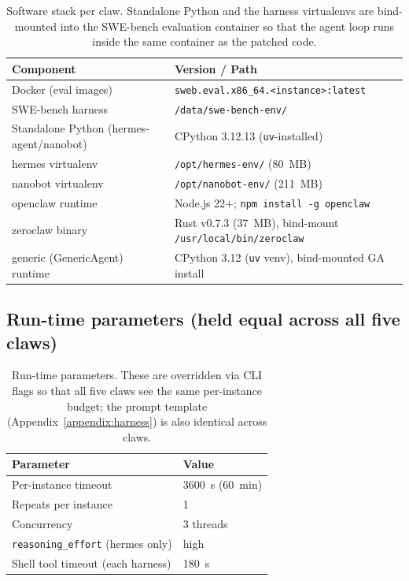 \begin{table}[h]
\centering
\small
\begin{tabular}{ll}
\toprule
\textbf{Component} & \textbf{Version / Path} \\
\midrule
Docker (eval images)               & \texttt{sweb.eval.x86\_64.<instance>:latest} \\
SWE-bench harness                  & \texttt{/data/swe-bench-env/} \\
Standalone Python (hermes-agent/nanobot) & CPython 3.12.13 (\texttt{uv}-installed) \\
hermes virtualenv                  & \texttt{/opt/hermes-env/} (80~MB) \\
nanobot virtualenv                 & \texttt{/opt/nanobot-env/} (211~MB) \\
openclaw runtime                   & Node.js 22+; \texttt{npm install -g openclaw} \\
zeroclaw binary                    & Rust v0.7.3 (37~MB), bind-mount \texttt{/usr/local/bin/zeroclaw} \\
generic (GenericAgent) runtime     & CPython 3.12 (\texttt{uv} venv), bind-mounted GA install \\
\bottomrule
\end{tabular}
\caption{Software stack per claw. Standalone Python and the harness virtualenvs
are bind-mounted into the SWE-bench evaluation container so that the agent loop
runs inside the same container as the patched code.}
\label{tab:appx-d-software}
\end{table}

\subsection{Run-time parameters (held equal across all five claws)}

\begin{table}[h]
\centering
\small
\begin{tabular}{ll}
\toprule
\textbf{Parameter} & \textbf{Value} \\
\midrule
Per-instance timeout                                & 3600~s (60~min) \\
Repeats per instance                                & 1 \\
Concurrency                                         & 3 threads \\
\texttt{reasoning\_effort} (hermes only)            & high \\
Shell tool timeout (each harness)                   & 180~s \\
\bottomrule
\end{tabular}
\caption{Run-time parameters. These are overridden via CLI flags so that all five
claws see the same per-instance budget; the prompt template
(Appendix~\ref{appendix:harness}) is also identical across claws.}
\label{tab:appx-d-runtime}
\end{table}

